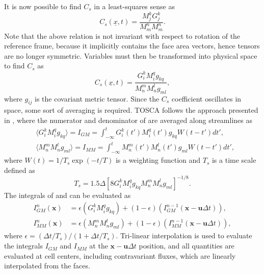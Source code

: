 It is now possible to find $C_s$ in a least-squares sense as 
\begin{equation}
	C_s(\underline{x},t) = \frac{M_j^k G_j^k}{M_m^n M_m^n} . \nonumber
\end{equation}
Note that the above relation is not invariant with respect to rotation of the reference frame, because it implicitly contains the face area vectors, hence tensors are no longer symmetric. Variables must then be transformed into physical space to find $C_s$ as
\begin{equation}
	C_s(\underline{x},t) = \frac{G_i^kM_i^q g_{kq}}{M_n^m M_n^l g_{ml}}, \label{eq:cscoeff}
\end{equation}
where $g_{ij}$ is the covariant metric tensor. Since the $C_s$ coefficient oscillates in space, some sort of averaging is required. TOSCA follows the approach presented in \cite{MeneveauEtAl1996}, where the numerator and denominator of  are averaged along streamlines as
\begin{align}
	&\langle G_i^kM_i^q g_{kq} \rangle = I_{GM} = \int_{-\infty}^{t}G_i^k(t')M_i^q(t')g_{kq}W(t-t')dt', \label{eq:lagrangianAvg1} \\
	&\langle M_n^mM_n^l g_{ml} \rangle = I_{MM} = \int_{-\infty}^{t}M_n^m(t')M_n^l(t')g_{ml}W(t-t')dt', \label{eq:lagrangianAvg2}
\end{align}
where $W(t) = 1/T_s \exp(-t/T)$ is a weighting function and $T_s$ is a time scale defined as
\begin{equation}
	T_s = 1.5\Delta \left[8G_i^kM_i^q g_{kq} M_n^mM_n^l g_{ml}\right]^{-1/8}.
\end{equation}
The integrals of  and  can be evaluated as
\begin{align}
	I_{GM}^n(\mathbf{x})  &= \epsilon(G_i^kM_i^q g_{kq}) + (1-\epsilon)(I_{GM}^{n-1}(\mathbf{x} - \mathbf{u}\Delta t)), \label{eq:lagrangianAvg3} \\
	I_{MM}^n(\mathbf{x})  &= \epsilon(M_n^mM_n^l g_{ml}) + (1-\epsilon)(I_{MM}^{n-1}(\mathbf{x} - \mathbf{u}\Delta t)), \label{eq:lagrangianAvg4}
\end{align}
where $\epsilon = (\Delta t / T_s)/(1 + \Delta t / T_s)$. Tri-linear interpolation is used to evaluate the integrals $I_{GM}$ and $I_{MM}$ at the $\mathbf{x} - \mathbf{u}\Delta t$ position, and all quantities are evaluated at cell centers, including contravariant fluxes, which are linearly interpolated from the faces. 

